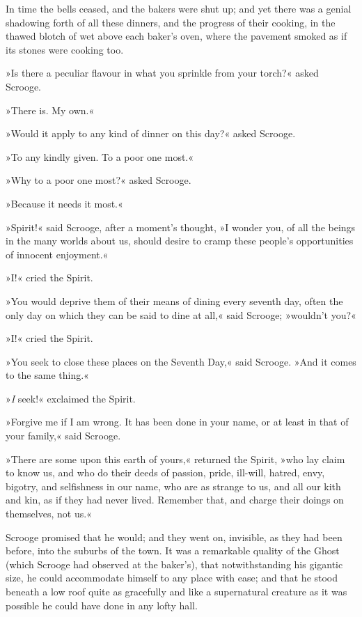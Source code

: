 In time the bells ceased, and the bakers were shut up; and yet there was a genial shadowing forth of all these dinners, and the progress of their cooking, in the thawed blotch of wet above each baker's oven, where the pavement smoked as if its stones were cooking too.

»Is there a peculiar flavour in what you sprinkle from your torch?« asked Scrooge.

»There is. My own.«

»Would it apply to any kind of dinner on this day?« asked Scrooge.

»To any kindly given. To a poor one most.«

»Why to a poor one most?« asked Scrooge.

»Because it needs it most.«

»Spirit!« said Scrooge, after a moment's thought, »I wonder you, of all the beings in the many worlds about us, should desire to cramp these people's opportunities of innocent enjoyment.«

»I!« cried the Spirit.


»You would deprive them of their means of dining every seventh day, often the only day on which they can be said to dine at all,« said Scrooge; »wouldn't you?«

»I!« cried the Spirit.

»You seek to close these places on the Seventh Day,« said Scrooge. »And it comes to the same thing.«

»\textit{I} seek!« exclaimed the Spirit.

»Forgive me if I am wrong. It has been done in your name, or at least in that of your family,« said Scrooge.

»There are some upon this earth of yours,« returned the Spirit, »who lay claim to know us, and who do their deeds of passion, pride, ill-will, hatred, envy, bigotry, and selfishness in our name, who are as strange to us, and all our kith and kin, as if they had never lived. Remember that, and charge their doings on themselves, not us.«


Scrooge promised that he would; and they went on, invisible, as they had been before, into the suburbs of the town. It was a remarkable quality of the Ghost (which Scrooge had observed at the baker's), that notwithstanding his gigantic size, he could accommodate himself to any place with ease; and that he stood beneath a low roof quite as gracefully and like a supernatural creature as it was possible he could have done in any lofty hall.



